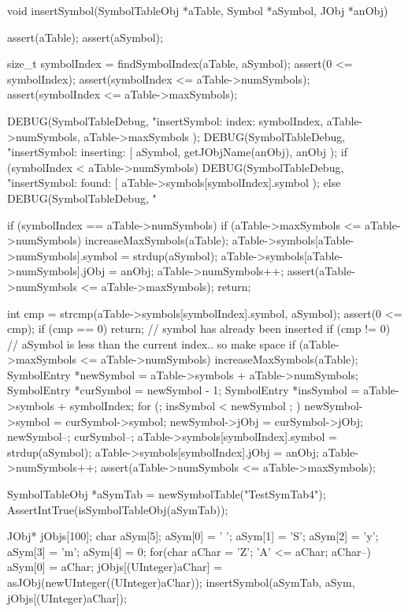 \startCCode
void insertSymbol(SymbolTableObj *aTable, Symbol *aSymbol, JObj *anObj) {
  assert(aTable);
  assert(aSymbol);
  
  size_t symbolIndex = findSymbolIndex(aTable, aSymbol);
  assert(0 <= symbolIndex);
  assert(symbolIndex <= aTable->numSymbols);
  assert(symbolIndex <= aTable->maxSymbols);
  
  DEBUG(SymbolTableDebug,
    "insertSymbol: index: %
    symbolIndex,
    aTable->numSymbols,
    aTable->maxSymbols
  );
  DEBUG(SymbolTableDebug,
    "insertSymbol: inserting: [%
    aSymbol,
    getJObjName(anObj),
    anObj
  );
  if (symbolIndex < aTable->numSymbols) {
    DEBUG(SymbolTableDebug,
      "insertSymbol: found: [%
      aTable->symbols[symbolIndex].symbol
    );
  } else {
    DEBUG(SymbolTableDebug, "%
  }
  
  if (symbolIndex == aTable->numSymbols) {
    if (aTable->maxSymbols <= aTable->numSymbols) increaseMaxSymbols(aTable);
    aTable->symbols[aTable->numSymbols].symbol = strdup(aSymbol);
    aTable->symbols[aTable->numSymbols].jObj   = anObj;
    aTable->numSymbols++;
    assert(aTable->numSymbols <= aTable->maxSymbols);
    return;
  }
  
  int cmp = strcmp(aTable->symbols[symbolIndex].symbol, aSymbol);
  assert(0 <= cmp);
  if (cmp == 0) return; // symbol has already been inserted
  if (cmp != 0) { // aSymbol is less than the current index.. so make space
    if (aTable->maxSymbols <= aTable->numSymbols) increaseMaxSymbols(aTable);
    SymbolEntry *newSymbol = aTable->symbols + aTable->numSymbols;
    SymbolEntry *curSymbol = newSymbol - 1;
    SymbolEntry *insSymbol = aTable->symbols + symbolIndex;
    for (; insSymbol < newSymbol ; ) {
      newSymbol->symbol = curSymbol->symbol;
      newSymbol->jObj   = curSymbol->jObj;
      newSymbol--;
      curSymbol--;
    }
  }
  aTable->symbols[symbolIndex].symbol = strdup(aSymbol);
  aTable->symbols[symbolIndex].jObj   = anObj;
  aTable->numSymbols++;
  assert(aTable->numSymbols <= aTable->maxSymbols);
}
\stopCCode


\startCTest
  SymbolTableObj *aSymTab = newSymbolTable("TestSymTab4");
  AssertIntTrue(isSymbolTableObj(aSymTab));

  JObj* jObjs[100];
  char aSym[5];
  aSym[0] = ' ';
  aSym[1] = 'S';
  aSym[2] = 'y';
  aSym[3] = 'm';
  aSym[4] = 0;
  for(char aChar = 'Z'; 'A' <= aChar; aChar--) {
    aSym[0]      = aChar;
    jObjs[(UInteger)aChar] = asJObj(newUInteger((UInteger)aChar));
    insertSymbol(aSymTab, aSym, jObjs[(UInteger)aChar]);
  }
  
